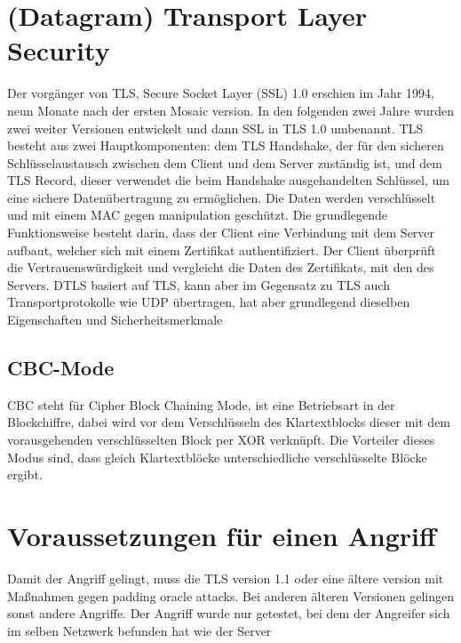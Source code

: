 \documentclass[a4paper,11pt]{scrartcl}
\begin{document}
    \section{(Datagram) Transport Layer Security}\label{sec:(d)tls}
    Der vorgänger von TLS, Secure Socket Layer (SSL) 1.0 erschien im Jahr 1994, neun Monate nach der ersten Mosaic version.
    In den folgenden zwei Jahre wurden zwei weiter Versionen entwickelt und dann SSL in TLS 1.0 umbenannt.
    \newline
    TLS besteht aus zwei Hauptkomponenten: dem TLS Handshake, der für den sicheren Schlüsselaustausch zwischen dem Client und dem Server zuständig ist,
    und dem TLS Record, dieser verwendet die beim Handshake ausgehandelten Schlüssel, um eine sichere Datenübertragung zu ermöglichen.
    Die Daten werden verschlüsselt und mit einem MAC gegen manipulation geschützt.
    Die grundlegende Funktionsweise besteht darin, dass der Client eine Verbindung mit dem Server aufbaut, welcher sich mit einem Zertifikat authentifiziert.
    Der Client überprüft die Vertrauenswürdigkeit und vergleicht die Daten des Zertifikats, mit den des Servers.
    \newline DTLS basiert auf TLS, kann aber im Gegensatz zu TLS auch Transportprotokolle wie UDP übertragen, hat aber grundlegend dieselben Eigenschaften und Sicherheitsmerkmale

    \subsection{CBC-Mode}\label{subsec:cbc-mode}
    CBC steht für Cipher Block Chaining Mode, ist eine Betriebsart in der Blockchiffre, dabei wird vor dem Verschlüsseln des Klartextblocks dieser mit dem vorausgehenden verschlüsselten Block per XOR verknüpft.
    Die Vorteiler dieses Modus sind, dass gleich Klartextblöcke unterschiedliche verschlüsselte Blöcke ergibt.


    \section{Voraussetzungen für einen Angriff}\label{sec:voraussetzungen-fur-einen-angriff}
    Damit der Angriff gelingt, muss die TLS version 1.1 oder eine ältere version mit Maßnahmen gegen padding oracle attacks.
    Bei anderen älteren Versionen gelingen sonst andere Angriffe.
    Der Angriff wurde nur getestet, bei dem der Angreifer sich im selben Netzwerk befunden hat wie der Server\cite[S. 11]{AlFardan2013}
\end{document}

